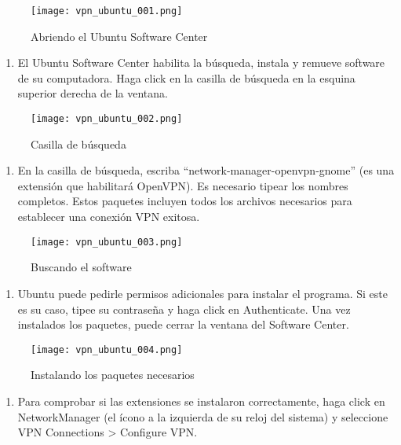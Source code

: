 \documentclass[10pt,a5paper,twoside,,]{book}
\providecommand{\tightlist}{%
  \setlength{\itemsep}{0pt}\setlength{\parskip}{0pt}}
\begin{document}
\begin{figure}[htbp]
\centering
\texttt{[image: vpn\_ubuntu\_001.png]}
\caption{Abriendo el Ubuntu Software Center}
\end{figure}

\begin{enumerate}
\def\labelenumi{\arabic{enumi}.}
\setcounter{enumi}{1}
\tightlist
\item
  El Ubuntu Software Center habilita la búsqueda, instala y remueve
  software de su computadora. Haga click en la casilla de búsqueda en la
  esquina superior derecha de la ventana.
\end{enumerate}

\begin{figure}[htbp]
\centering
\texttt{[image: vpn\_ubuntu\_002.png]}
\caption{Casilla de búsqueda}
\end{figure}

\begin{enumerate}
\def\labelenumi{\arabic{enumi}.}
\setcounter{enumi}{2}
\tightlist
\item
  En la casilla de búsqueda, escriba ``network-manager-openvpn-gnome''
  (es una extensión que habilitará OpenVPN). Es necesario tipear los
  nombres completos. Estos paquetes incluyen todos los archivos
  necesarios para establecer una conexión VPN exitosa.
\end{enumerate}

\begin{figure}[htbp]
\centering
\texttt{[image: vpn\_ubuntu\_003.png]}
\caption{Buscando el software}
\end{figure}

\begin{enumerate}
\def\labelenumi{\arabic{enumi}.}
\setcounter{enumi}{3}
\tightlist
\item
  Ubuntu puede pedirle permisos adicionales para instalar el programa.
  Si este es su caso, tipee su contraseña y haga click en Authenticate.
  Una vez instalados los paquetes, puede cerrar la ventana del Software
  Center.
\end{enumerate}

\begin{figure}[htbp]
\centering
\texttt{[image: vpn\_ubuntu\_004.png]}
\caption{Instalando los paquetes necesarios}
\end{figure}

\begin{enumerate}
\def\labelenumi{\arabic{enumi}.}
\setcounter{enumi}{4}
\tightlist
\item
  Para comprobar si las extensiones se instalaron correctamente, haga
  click en NetworkManager (el ícono a la izquierda de su reloj del
  sistema) y seleccione VPN Connections \textgreater{} Configure VPN.
\end{enumerate}
\end{document}
